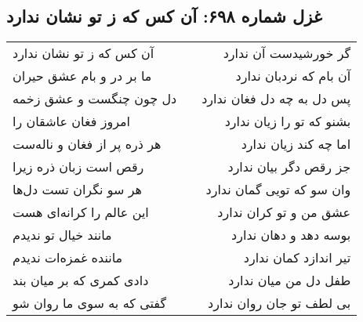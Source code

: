 \begin{center}
\section*{غزل شماره ۶۹۸: آن کس که ز تو نشان ندارد}
\label{sec:0698}
\begin{longtable}{l p{0.5cm} r}
آن کس که ز تو نشان ندارد
&&
گر خورشیدست آن ندارد
\\
ما بر در و بام عشق حیران
&&
آن بام که نردبان ندارد
\\
دل چون چنگست و عشق زخمه
&&
پس دل به چه دل فغان ندارد
\\
امروز فغان عاشقان را
&&
بشنو که تو را زیان ندارد
\\
هر ذره پر از فغان و ناله‌ست
&&
اما چه کند زیان ندارد
\\
رقص است زبان ذره زیرا
&&
جز رقص دگر بیان ندارد
\\
هر سو نگران تست دل‌ها
&&
وان سو که تویی گمان ندارد
\\
این عالم را کرانه‌ای هست
&&
عشق من و تو کران ندارد
\\
مانند خیال تو ندیدم
&&
بوسه دهد و دهان ندارد
\\
ماننده غمزه‌ات ندیدم
&&
تیر اندازد کمان ندارد
\\
دادی کمری که بر میان بند
&&
طفل دل من میان ندارد
\\
گفتی که به سوی ما روان شو
&&
بی لطف تو جان روان ندارد
\\
\end{longtable}
\end{center}
